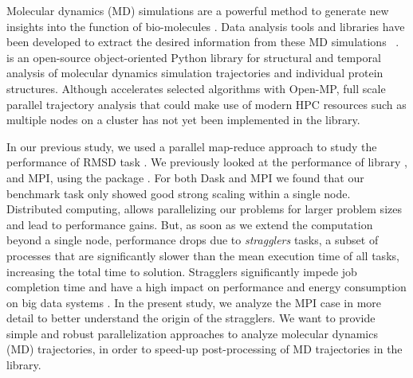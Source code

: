 \label{sec:introduction}
Molecular dynamics (MD) simulations are a powerful method to generate new insights into the function of bio-molecules \cite{QwikMD2016}.
Data analysis tools and libraries have been developed to extract the desired information from these MD simulations ~\cite{Gowers:2016aa,Michaud-Agrawal:2011fu,cpptraj-2013,himach-2008,mdtraj-2015,Mura:2010mw}. 
 \citep{Gowers:2016aa,Michaud-Agrawal:2011fu} is an open-source object-oriented Python library for structural and temporal analysis of molecular dynamics simulation trajectories and individual protein structures. 
Although  accelerates selected algorithms with Open-MP, full scale parallel trajectory analysis that could make use of modern HPC resources such as multiple nodes on a cluster has not yet been implemented in the library. 

In our previous study, we used a parallel map-reduce approach to study the performance of RMSD task \cite{Khoshlessan:2017ab, ICCP-2018}. 
We previously looked at the performance of  library \cite{Rocklin:2015aa}, and MPI, using the  package \cite{Dalcin:2011aa, Dalcin:2005aa}. 
For both Dask and MPI we found that our benchmark task only showed good strong scaling within a single node.
Distributed computing, allows parallelizing our problems for larger problem sizes and lead to performance gains.
But, as soon as we extend the computation beyond a single node, performance drops due to \emph{stragglers} tasks, a subset of processes that are significantly slower than the mean execution time of all tasks, increasing the total time to solution.
Stragglers significantly impede job completion time \cite{Garraghan2016} and have a high impact on performance and energy consumption on big data systems \cite{Tien-2017}.
In the present study, we analyze the MPI case in more detail to better understand the origin of the stragglers.
We want to provide simple and robust parallelization approaches to analyze molecular dynamics (MD) trajectories, in order to speed-up post-processing of MD trajectories in the  library. 


